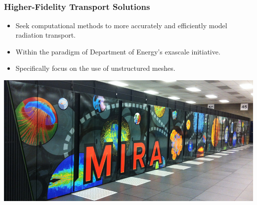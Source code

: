 \documentclass[compress,10pt]{beamer}
\begin{document}
\subsection{}
\begin{frame}[t]\frametitle{Higher-Fidelity Transport Solutions}
\centering
\begin{block}{}
\begin{itemize}
\item Seek computational methods to more accurately and efficiently model radiation transport.
\item Within the paradigm of Department of Energy's exascale initiative.
\item Specifically focus on the use of unstructured meshes.
\end{itemize}
\end{block}
\centering
\vspace{3mm}
{}\includegraphics[width=0.80\columnwidth]{images/b_2558.jpg}
\end{frame}
\end{document}
